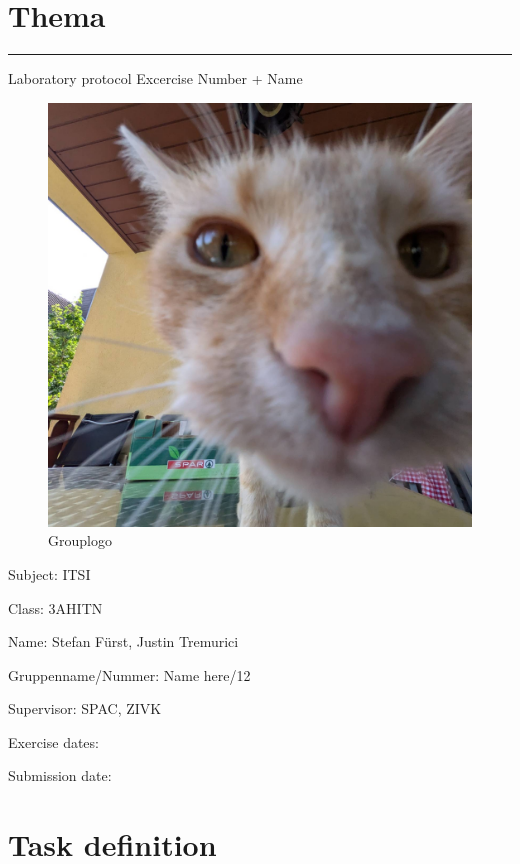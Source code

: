 \documentclass[a4paper]{article}
\begin{document}

\pagestyle{oida}
\section*{Thema}
\par\noindent\rule{\textwidth}{0.4pt}

Laboratory protocol
Excercise Number + Name

\begin{figure}[h]
	\includegraphics[scale=0.3]{images/mika.jpeg}
	\caption{Grouplogo}
\end{figure}

\vspace*{\fill}
Subject:	ITSI

Class:	3AHITN

Name:	Stefan Fürst, Justin Tremurici

Gruppenname/Nummer: Name here/12

Supervisor: 	SPAC, ZIVK

Exercise dates:	

Submission date:


\newpage
\tableofcontents

\newpage

\section{Task definition}
\end{document}
